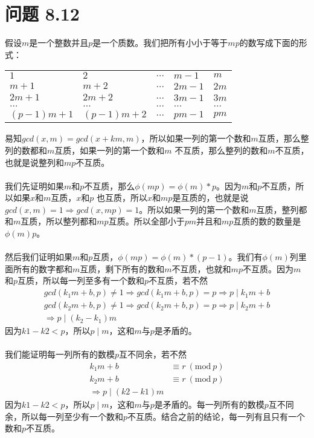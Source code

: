 \documentclass[acmlarge,screen]{acmart}
\begin{document}
\section{问题 8.12}
假设$m$是一个整数并且$p$是一个质数。我们把所有小小于等于$mp$的数写成下面的形式：
\begin{center}
	\begin{tabular}{m{5em} m{5em} m{5em} m{5em} m{5em}}
    $1$&$2$&$...$&$m-1$&$m$\\
    $m+1$&$m+2$&$...$&$2m-1$&$2m$\\
    $2m+1$&$2m+2$&$...$&$3m-1$&$3m$\\
    $...$&$...$&$...$&$...$&$...$\\
    $(p-1)m+1$&$(p-1)m+2$&$...$&$pm-1$&$pm$\\
\end{tabular}
\end{center}
易知$gcd(x,m)=gcd(x+km, m)$，所以如果一列的第一个数和$m$互质，那么整列的数都和$m$互质，如果一列的第一个数和$m$ 不互质，那么整列的数和$m$不互质，也就是说整列和$mp$不互质。\\\\
我们先证明如果$m$和$p$不互质，那么$\phi(mp)=\phi(m)*p$。因为$m$和$p$不互质，所以如果$x$和$m$互质，$x$和$p$ 也互质，所以$x$和$mp$是互质的，也就是说$gcd(x, m)=1\Rightarrow gcd(x, mp)=1$。所以如果一列的第一个数和$m$互质，整列都和$m$互质，所以整列都和$mp$互质。所以全部小于$pm$并且和$mp$互质的数的数量是$\phi(m)p$。\\\\
然后我们证明如果$m$和$p$互质，$\phi(mp)=\phi(m)*(p-1)$。我们有$\phi(m)$列里面所有的数字都和$m$互质，剩下所有的数和$m$不互质，也就和$mp$不互质。因为$m$和$p$互质，所以每一列至多有一个数和$p$不互质，若不然
\begin{align*}
	gcd(k_1m+b,p)\neq1 \Rightarrow gcd(k_1m+b,p)=p \Rightarrow p\mid k_1m+b\\
	gcd(k_2m+b,p)\neq1 \Rightarrow gcd(k_2m+b,p)=p \Rightarrow p\mid k_2m+b\\
	\Rightarrow p \mid(k_2-k_1)m
\end{align*}
因为$k1-k2<p$，所以$p\mid m$，这和$m$与$p$是矛盾的。\\\\
我们能证明每一列所有的数模$p$互不同余，若不然
\begin{align*}
	k_1m+b&\equiv r\ (\text{mod}\ p)\\
	k_2m+b&\equiv r\ (\text{mod}\ p)\\
	\Rightarrow p \mid(k2-k1)m
\end{align*}
因为$k1-k2<p$，所以$p\mid m$，这和$m$与$p$是矛盾的。每一列所有的数模$p$互不同余，所以每一列至少有一个数和$p$不互质。结合之前的结论，每一列有且只有一个数和$p$不互质。\\\\
\end{document}
